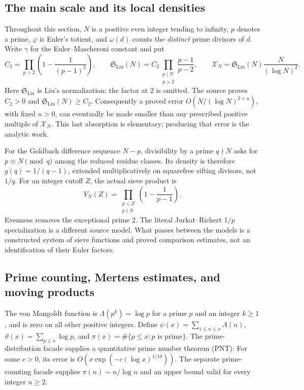 \subsection{The main scale and its local densities}

Throughout this section, $N$ is a positive even integer tending to infinity,
$p$ denotes a prime, $\varphi$ is Euler's totient, and $\omega(d)$ counts the
\emph{distinct} prime divisors of $d$.
Write $\gamma$ for the Euler--Mascheroni constant and put
\[
 C_2=\prod_{p>2}\left(1-\frac1{(p-1)^2}\right),\qquad
 \mathfrak S_{\mathrm{Liu}}(N)=C_2\prod_{\substack{p\mid N\\p>2}}\frac{p-1}{p-2},
 \qquad \mathcal X_N=\mathfrak S_{\mathrm{Liu}}(N)\frac{N}{(\log N)^2}.
\]
Here $\mathfrak S_{\mathrm{Liu}}$ is Liu's normalization: the factor at $2$ is omitted.
The source proves $C_2>0$ and $\mathfrak S_{\mathrm{Liu}}(N)\ge C_2$.
Consequently a proved error $O(N/(\log N)^{2+u})$, with fixed $u>0$,
can eventually be made smaller than any prescribed positive multiple of $\mathcal X_N$.
This last absorption is elementary; producing that error is the analytic work.

For the Goldbach difference sequence $N-p$, divisibility by a prime $q\nmid N$
asks for $p\equiv N\pmod q$ among the reduced residue classes.
Its density is therefore $g(q)=1/(q-1)$, extended multiplicatively on squarefree
sifting divisors, not $1/q$.
For an integer cutoff $Z$, the actual sieve product is
\[
 V_N(Z)=\prod_{\substack{p<Z\\p\nmid N}}\left(1-\frac1{p-1}\right).
\]
Evenness removes the exceptional prime $2$.
The literal Jurkat--Richert $1/p$ specialization is a different source model.
What passes between the models is a constructed system of sieve functions and
proved comparison estimates, not an identification of their Euler factors.

\subsection{Prime counting, Mertens estimates, and moving products}

The von Mangoldt function is $\Lambda(p^k)=\log p$ for a prime $p$
and an integer $k\ge1$, and is zero on all other positive integers.
Define $\psi(x)=\sum_{1\le n\le x}\Lambda(n)$,
$\vartheta(x)=\sum_{p\le x}\log p$, and
$\pi(x)=\#\{p\le x:p\text{ is prime}\}$.
The prime-distribution facade supplies a quantitative prime number theorem (PNT):
For some $c>0$, its error is $O(x\exp(-c(\log x)^{1/10}))$.
The separate prime-counting facade supplies $\pi(n)\sim n/\log n$ and
an upper bound valid for every integer $n\ge2$.

